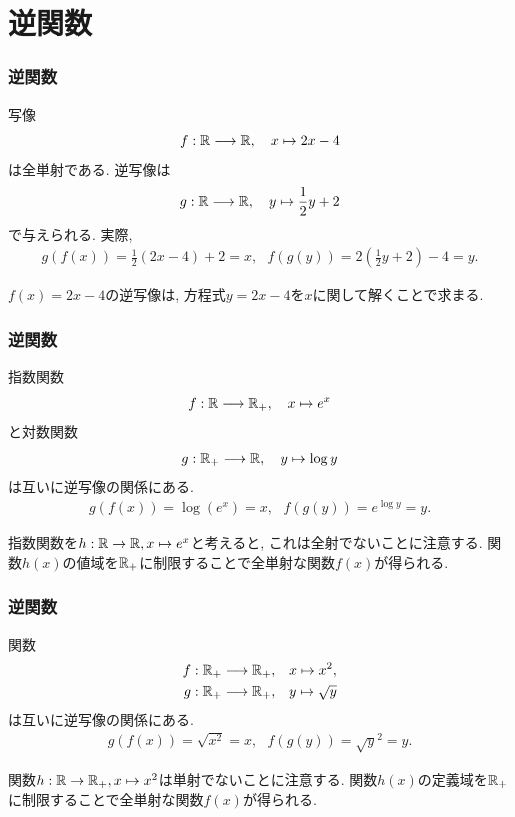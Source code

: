 \section{逆関数}

\begin{frame}
\frametitle{逆関数}



\begin{Ex}
写像
$$
f:\mathbb{R} \longrightarrow \mathbb{R}, \ \ \ x \mapsto 2x-4
$$
は全単射である. 
逆写像は
$$
g:\mathbb{R} \longrightarrow \mathbb{R}, \ \ \ y \mapsto \frac{1}{2}y+2
$$
で与えられる. 
実際, 
\begin{align*}
g(f(x))=\frac{1}{2}(2x-4)+2=x, \ \ \ 
f(g(y))=2(\frac{1}{2}y+2)-4=y. 
\end{align*}
\end{Ex}
$f(x)=2x-4$の逆写像は, 方程式$y=2x-4$を$x$に関して解くことで求まる. 


\end{frame}





\begin{frame}
\frametitle{逆関数}



\begin{Ex}
指数関数
$$
f: \R \longrightarrow \R_+, \ \ \ x \mapsto e^x
$$
と対数関数
$$
g: \mathbb{R}_+ \longrightarrow \mathbb{R}, \ \ \ y \mapsto \log y
$$
は互いに逆写像の関係にある. 
\begin{align*}
g(f(x))=\log(e^x)=x, \ \ \ f(g(y))=e^{\log y}=y.
\end{align*}
\end{Ex}
指数関数を$h:\mathbb{R} \rightarrow \mathbb{R}, x \mapsto e^x$と考えると, これは全射でないことに注意する. 
関数$h(x)$の値域を$\mathbb{R}_+$に制限することで全単射な関数$f(x)$が得られる. 

\end{frame}




\begin{frame}
\frametitle{逆関数}



\begin{Ex}
関数
\begin{align*}
f: \mathbb{R}_+ \longrightarrow \mathbb{R}_+, & \ \ \ x \mapsto x^2, \\
g: \mathbb{R}_+ \longrightarrow \mathbb{R}_+, & \ \ \ y \mapsto \sqrt{y}
\end{align*}
は互いに逆写像の関係にある. 
\begin{align*}
g(f(x))=\sqrt{x^2}=x, \ \ \ f(g(y))=\sqrt{y}^2=y.
\end{align*}
\end{Ex}
関数$h:\mathbb{R} \rightarrow \mathbb{R}_+, x \mapsto x^2$は単射でないことに注意する. 
関数$h(x)$の定義域を$\mathbb{R}_+$に制限することで全単射な関数$f(x)$が得られる. 
\end{frame}




